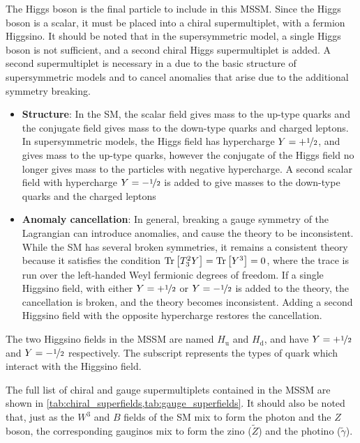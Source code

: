 The Higgs boson is the final particle to include in this MSSM.
Since the Higgs boson is a scalar, it must be placed into a chiral
supermultiplet, with a fermion Higgsino.
It should be noted that in the supersymmetric model, a single Higgs boson is
not sufficient, and a second chiral Higgs supermultiplet is added.
A second supermultiplet is necessary in a due to the basic structure of
supersymmetric models and to cancel anomalies that arise due to the additional
symmetry breaking.
\begin{itemize}
  \item \textbf{Structure}: In the SM, the scalar field gives mass to the
    up-type quarks and the conjugate field gives mass to the down-type quarks
    and charged leptons.
    In supersymmetric models, the Higgs field has hypercharge
    $Y=+\nicefrac{1}{2}$, and gives mass to the up-type quarks, however the
    conjugate of the Higgs field no longer gives mass to the particles with
    negative hypercharge.
    A second scalar field with hypercharge $Y=-\nicefrac{1}{2}$ is added to
    give masses to the down-type quarks and the charged leptons
  \item \textbf{Anomaly cancellation}: In general, breaking a gauge symmetry
    of the Lagrangian can introduce anomalies, and cause the theory to be
    inconsistent.
    While the SM has several broken symmetries, it remains a consistent theory
    because it satisfies the condition
    $\Tr\left[ T_3^2 Y \right] = \Tr\left[ Y^3 \right] = 0$, where the trace
    is run over the left-handed Weyl fermionic degrees of freedom.
    If a single Higgsino field, with either $Y=+\nicefrac{1}{2}$ or
    $Y=-\nicefrac{1}{2}$ is added to the theory, the cancellation is broken,
    and the theory becomes inconsistent.
    Adding a second Higgsino field with the opposite hypercharge restores the
    cancellation.
\end{itemize}
The two Higgsino fields in the MSSM are named $H_\mathrm{u}$ and $H_\mathrm{d}$,
and have $Y=+\nicefrac{1}{2}$ and $Y=-\nicefrac{1}{2}$ respectively.
The subscript represents the types of quark which interact with the Higgsino
field.

The full list of chiral and gauge supermultiplets contained in the MSSM are
shown in \cref{tab:chiral_superfields,tab:gauge_superfields}.
It should also be noted that, just as the $W^3$ and $B$ fields of the SM mix to
form the photon and the $Z$ boson, the corresponding gauginos mix to form the
zino ($\tilde{Z}$) and the photino ($\tilde{\gamma}$).

